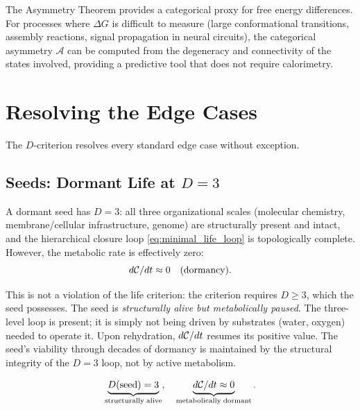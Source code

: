 \begin{remark}
The Asymmetry Theorem provides a categorical proxy for free energy differences.
For processes where $\Delta G$ is difficult to measure (large conformational
transitions, assembly reactions, signal propagation in neural circuits), the
categorical asymmetry $\mathcal{A}$ can be computed from the degeneracy and
connectivity of the states involved, providing a predictive tool that does
not require calorimetry.
\end{remark}

\section{Resolving the Edge Cases}
\label{sec:edge_cases}

The $D$-criterion resolves every standard edge case without exception.

\subsection{Seeds: Dormant Life at $D = 3$}

A dormant seed has $D = 3$: all three organizational scales (molecular
chemistry, membrane/cellular infrastructure, genome) are structurally present
and intact, and the hierarchical closure loop \eqref{eq:minimal_life_loop}
is topologically complete. However, the metabolic rate is effectively zero:
\begin{equation}
  d\mathcal{C}/dt \approx 0 \quad \text{(dormancy)}.
  \label{eq:seed_dormancy}
\end{equation}

This is not a violation of the life criterion: the criterion requires $D \geq 3$,
which the seed possesses. The seed is \emph{structurally alive but metabolically
paused}. The three-level loop is present; it is simply not being driven by
substrates (water, oxygen) needed to operate it. Upon rehydration, $d\mathcal{C}/dt$
resumes its positive value. The seed's viability through decades of dormancy
is maintained by the structural integrity of the $D = 3$ loop, not by active
metabolism.

\begin{equation}
  \underbrace{D({\rm seed}) = 3}_{\rm structurally \; alive},
  \quad
  \underbrace{d\mathcal{C}/dt \approx 0}_{\rm metabolically \; dormant}.
  \label{eq:seed_classification}
\end{equation}


